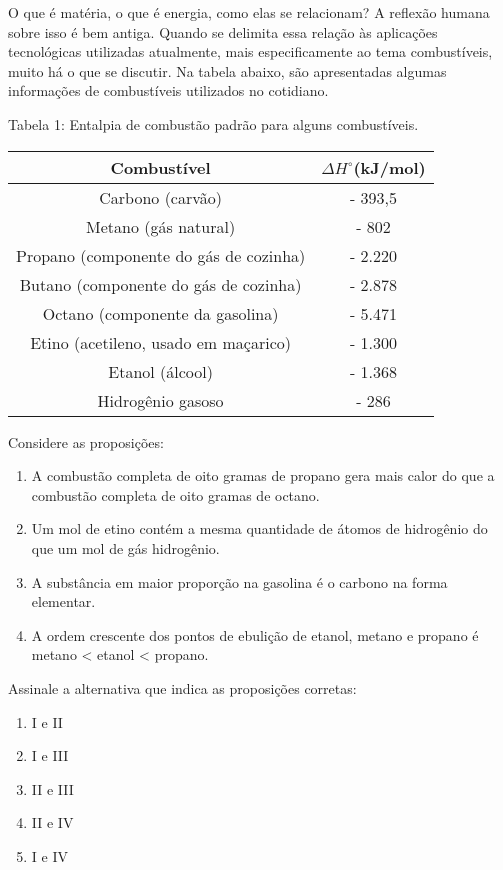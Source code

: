 O que é matéria, o que é energia, como elas se relacionam? A reflexão humana sobre isso é bem antiga. Quando se delimita essa relação às aplicações tecnológicas utilizadas atualmente, mais especificamente ao tema combustíveis, muito há o que se discutir. Na tabela abaixo, são apresentadas algumas informações de combustíveis utilizados no cotidiano.

\begin{center}

Tabela 1: Entalpia de combustão padrão para alguns combustíveis.

\renewcommand{\arraystretch}{1.5}
\begin{tabular}{|c|c|}
	\hline
	Combustível & $\Delta H^\circ$(kJ/mol) \\
	\hline 
	Carbono (carvão) &- 393,5 \\ 
	\hline
	Metano (gás natural) & - 802 \\ 
	\hline
	Propano (componente do gás de cozinha) &  - 2.220 \\
	\hline
	Butano (componente do gás de cozinha) &  - 2.878 \\
	\hline
	Octano (componente da gasolina) & - 5.471 \\
	\hline
	Etino (acetileno, usado em maçarico) &  - 1.300 \\
	\hline
	Etanol (álcool) &  - 1.368 \\
	\hline
	Hidrogênio gasoso &  - 286 \\
	\hline
\end{tabular}
\end{center}

Considere as proposições:

\begin{enumerate}[label = (\Roman*)]
	\item A combustão completa de oito gramas de propano gera mais calor do que a combustão completa de oito gramas de octano.
	\item Um mol de etino contém a mesma quantidade de átomos de hidrogênio do que um mol de gás hidrogênio.
	\item A substância em maior proporção na gasolina é o carbono na forma elementar. 
	\item  A ordem crescente dos pontos de ebulição de etanol, metano e propano é metano < etanol < propano.
\end{enumerate}

	Assinale a alternativa que indica as proposições corretas:

	\begin{enumerate}[label = (\alph*)]
	\item I e II 
	\item I e III 
	\item II e III 
	\item II e IV 
	\item I e IV
\end{enumerate}


